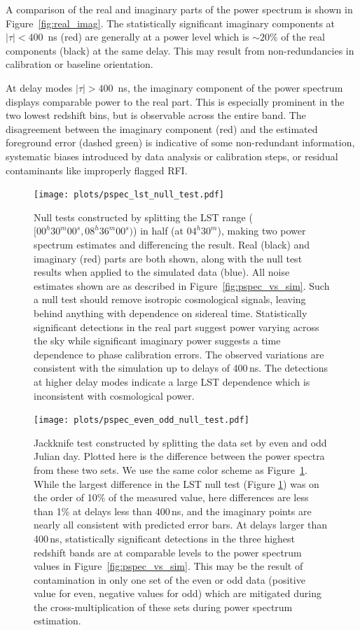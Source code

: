 A comparison of the real and imaginary parts of the power spectrum
is shown in Figure~\ref{fig:real_imag}.
The statistically significant imaginary components at
$ |\tau| < 400 $~ns (red) are generally at a power level
which is $ \sim 20\% $ of the real components (black) at the same delay.
This may result from non-redundancies in calibration or baseline orientation.

At delay modes $ |\tau| > 400 $~ns, the imaginary
component of the power spectrum displays comparable power to the 
real part. This is especially prominent in the two lowest redshift bins, but is observable across the entire band.
The disagreement between the imaginary component (red) and the estimated foreground error (dashed green) is indicative of some non-redundant information, systematic biases introduced by data analysis or calibration steps, or residual contaminants like improperly flagged RFI.

\begin{figure}[tp]
\centering
\texttt{[image: plots/pspec\_lst\_null\_test.pdf]}
\caption{Null tests constructed by splitting the LST range ($[00^{h}30^{m}00^{s}, 08^{h}36^{m}00^{s}) $) in half (at $04^{h}30^{m}$), making two
power spectrum estimates and differencing the result. Real (black) and imaginary (red) parts are both shown, along with the null test results
when applied to the simulated data (blue). All noise estimates shown are as described in Figure~\ref{fig:pspec_vs_sim}.
Such a null test should remove
isotropic cosmological signals, leaving behind anything with dependence on sidereal time. Statistically significant detections in the real part suggest power varying across the sky while significant imaginary power suggests a time dependence to phase calibration errors. The observed variations are consistent with the simulation up to delays of 400\,ns.
The detections at higher delay modes indicate a large 
LST dependence which is inconsistent with cosmological power.}
\label{fig:lst_null_test}
\end{figure}

\begin{figure}[tp]
\centering
\texttt{[image: plots/pspec\_even\_odd\_null\_test.pdf]}
\caption{Jackknife test constructed by splitting the data set by even and odd Julian day. Plotted here is the difference between the power spectra from these two sets. We use the same color scheme as Figure~\ref{fig:lst_null_test}. While the largest difference in the LST null test
(Figure \ref{fig:lst_null_test}) was on the order of 10\% of the measured value, here differences are less than 1\% at delays less than 400\,ns, and the imaginary points are nearly all consistent with predicted error bars. At delays larger than 400\,ns, statistically significant detections
in the three highest redshift bands are at comparable
levels to the power spectrum values in Figure~\ref{fig:pspec_vs_sim}.
This may be the result of contamination in only one set of the even or odd data (positive value for even, negative values for odd) which are mitigated during the cross-multiplication of these sets during power spectrum estimation.}
\label{fig:even_odd_null_test}
\end{figure}

